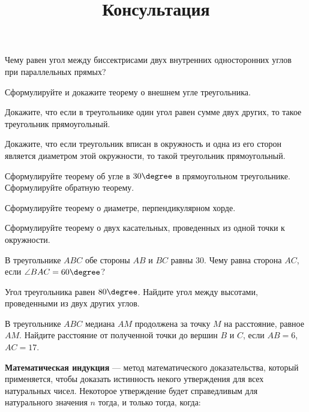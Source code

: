\begin{listofex}
	\item
	\begin{enumcols}[itemcolumns=1]
		\item Чему равен угол между биссектрисами двух внутренних односторонних углов при параллельных прямых?
		\item Сформулируйте и докажите теорему о внешнем угле треугольника.
		\item Докажите, что если в треугольнике один угол равен сумме двух других, то такое треугольник прямоугольный.
		\item Докажите, что если треугольник вписан в окружность и одна из его сторон является диаметром этой окружности, то такой треугольник прямоугольный.
		\item Сформулируйте теорему об угле в \( 30\degree \) в прямоугольном треугольнике. Сформулируйте обратную теорему.
		\item Сформулируйте теорему о диаметре, перпендикулярном хорде.
		\item Сформулируйте теорему о двух касательных, проведенных из одной точки к окружности.
	\end{enumcols}
	\item В треугольнике \( ABC \) обе стороны \( AB \) и \( BC \) равны \( 30 \). Чему равна сторона \( AC \), если \( \angle BAC = 60 \degree \)?
	\item Угол треугольника равен \( 80\degree \). Найдите угол между высотами, проведенными из двух других углов.
	\item {}
	\item {}
	\item {}
	\item {}
	\item В треугольнике \( ABC \) медиана \( AM \) продолжена за точку \( M \) на расстояние, равное \( AM \). Найдите расстояние от полученной точки до вершин \( B  \) и \( C\), если \( AB = 6\), \( AC = 17\).
	\item {}
	\item {}
	\item {}
\end{listofex}
\newpage
\title{Консультация}
\textbf{Математическая индукция} --- метод математического доказательства, который применяется, чтобы доказать истинность некого утверждения для всех натуральных чисел. Некоторое утверждение будет справедливым для натурального значения \( n \) тогда, и только тогда, когда:
